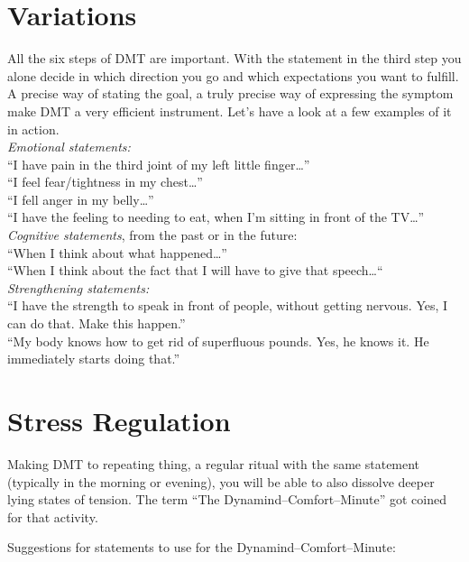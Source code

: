 \documentclass[../main.tex]{subfiles}
\begin{document}


\section{Variations}

All the six steps of DMT are important.
With the statement in the third step you alone decide in which direction you go and which expectations you want to fulfill.
A precise way of stating the goal, a truly precise way of expressing the symptom make DMT a very efficient instrument.
Let's have a look at a few examples of it in action.\\

\noindent \emph{Emotional statements:}\\
``I have pain in the third joint of my left little finger\ldots''\\
``I feel fear/tightness in my chest\ldots''\\
``I fell anger in my belly\ldots''\\
``I have the feeling to needing to eat, when I'm sitting in front of the TV\ldots''\\

\noindent \emph{Cognitive statements}, from the past or in the future:\\
``When I think about what happened\ldots''\\
``When I think about the fact that I  will have to give that speech\ldots``\\

\noindent \emph{Strengthening statements:}\\
``I have the strength to speak in front of people, without getting nervous. Yes, I can do that. Make this happen.''\\
``My body knows how to get rid of superfluous pounds. Yes, he knows it. He immediately starts doing that.''

\section{Stress Regulation}

Making DMT to repeating thing, a regular ritual with the same statement (typically in the morning or evening),
you will be able to also dissolve deeper lying states of tension.
The term ``The Dynamind--Comfort--Minute'' got coined for that activity.

Suggestions for statements to use for the Dynamind--Comfort--Minute:
\end{document}
